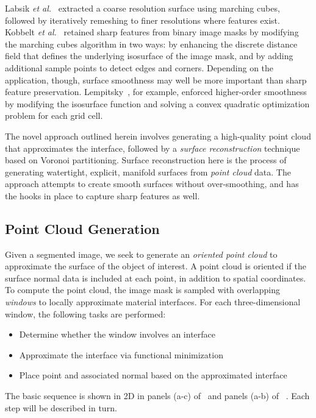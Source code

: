 Labsik \textit{et al.}~\cite{labsik_2002} extracted a coarse resolution surface using marching cubes, followed by iteratively remeshing to finer resolutions where features exist. Kobbelt \textit{et al.}~\cite{kobbelt_2001} retained sharp features from binary image masks by modifying the marching cubes algorithm in two ways: by enhancing the discrete distance field that defines the underlying isosurface of the image mask, and by adding additional sample points to detect edges and corners. Depending on the application, though, surface smoothness may well be more important than sharp feature preservation. Lempitsky~\cite{lempitsky_2010}, for example, enforced higher-order smoothness by modifying the isosurface function and solving a convex quadratic optimization problem for each grid cell.

The novel approach outlined herein involves generating a high-quality point cloud that approximates the interface, followed by a  \textit{surface reconstruction} technique based on Voronoi partitioning. Surface reconstruction here is the process of generating watertight, explicit, manifold surfaces from \textit{point cloud} data. The approach attempts to create smooth surfaces without over-smoothing, and has the hooks in place to capture sharp features as well.

\subsection{Point Cloud Generation}
\label{Point Cloud Generation}

Given a segmented image, we seek to generate an \textit{oriented point cloud} to approximate the surface of the object of interest. A point cloud is oriented if the surface normal data is included at each point, in addition to spatial coordinates. To compute the point cloud, the image mask is sampled with overlapping \textit{windows} to locally approximate material interfaces. For each three-dimensional window, the following tasks are performed:
\begin{itemize}[noitemsep]
  \item Determine whether the window involves an interface
  \item Approximate the interface via functional minimization
  \item Place point and associated normal based on the approximated interface
\end{itemize}
The basic sequence is shown in 2D in panels (a-c) of~ and panels (a-b) of ~. Each step will be described in turn.

